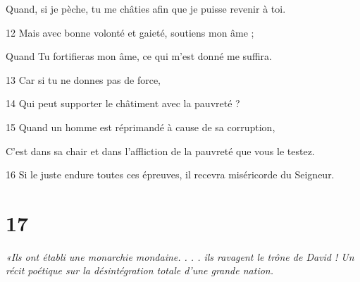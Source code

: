 \par     Quand, si je pèche, tu me châties afin que je puisse revenir à toi.
\par 12 Mais avec bonne volonté et gaieté, soutiens mon âme ;
\par     Quand Tu fortifieras mon âme, ce qui m'est donné me suffira.
\par 13 Car si tu ne donnes pas de force,
\par 14 Qui peut supporter le châtiment avec la pauvreté ?
\par 15 Quand un homme est réprimandé à cause de sa corruption,
\par     C'est dans sa chair et dans l'affliction de la pauvreté que vous le testez.
\par 16 Si le juste endure toutes ces épreuves, il recevra miséricorde du Seigneur.

\chapter{17}

\par \textit{«Ils ont établi une monarchie mondaine. . . . ils ravagent le trône de David ! Un récit poétique sur la désintégration totale d'une grande nation.}

